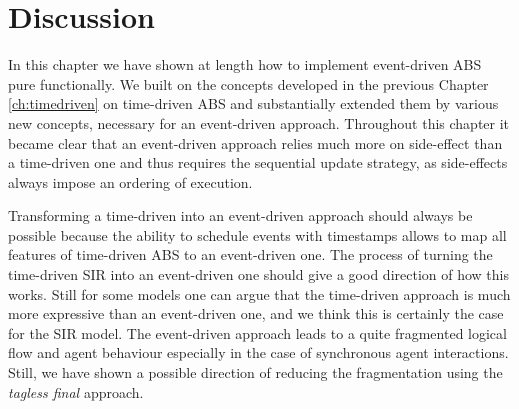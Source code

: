 \section{Discussion}
In this chapter we have shown at length how to implement event-driven ABS pure functionally. We built on the concepts developed in the previous Chapter \ref{ch:timedriven} on time-driven ABS and substantially extended them by various new concepts, necessary for an event-driven approach. Throughout this chapter it became clear that an event-driven approach relies much more on side-effect than a time-driven one and thus requires the sequential update strategy, as side-effects always impose an ordering of execution.

Transforming a time-driven into an event-driven approach should always be possible because the ability to schedule events with timestamps allows to map all features of time-driven ABS to an event-driven one. The process of turning the time-driven SIR into an event-driven one should give a good direction of how this works. Still for some models one can argue that the time-driven approach is much more expressive than an event-driven one, and we think this is certainly the case for the SIR model. The event-driven approach leads to a quite fragmented logical flow and agent behaviour especially in the case of synchronous agent interactions. Still, we have shown a possible direction of reducing the fragmentation using the \textit{tagless final} approach.

